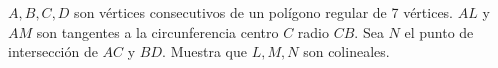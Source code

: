 $A, B, C, D$ son vértices consecutivos de un polígono regular de 7 vértices. $AL$ y $AM$ son tangentes a la circunferencia centro $C$ radio $CB.$ Sea $N$ el punto de intersección de $AC$ y $BD.$ Muestra que $L, M, N$ son colineales.